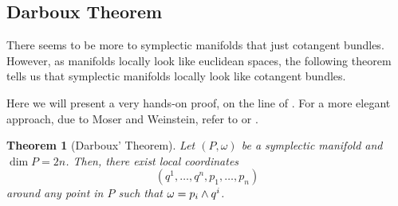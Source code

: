 \documentclass[english,fontsize=11pt,paper=a5,oneside]{scrbook}
\let\d\relax
\newcommand{\d}{\mathrm{d}}
\newtheorem{theorem}{Theorem}[chapter]
\theoremstyle{definition}
\begin{document}
\subsection{Darboux Theorem}

There seems to be more to symplectic manifolds that just cotangent bundles.
However, as manifolds locally look like euclidean spaces, the following theorem tells us that symplectic manifolds locally look like cotangent bundles.

Here we will present a very hands-on proof, on the line of \cite[Problem 22-19]{book:lee}. For a more elegant approach, due to Moser and Weinstein, refer to \cite[Chapter 22]{book:lee} or \cite[Chapter 10.3]{book:knauf}.

\begin{theorem}[Darboux' Theorem]
  Let $(P, \omega)$ be a symplectic manifold and $\dim P = 2n$.
  Then, there exist local coordinates
  \begin{equation}
    (q^1, \ldots, q^n, p_1, \ldots, p_n)
  \end{equation} around any point in $P$ such that $\omega = \d p_i \wedge \d q^i$.
\end{theorem}
\end{document}
